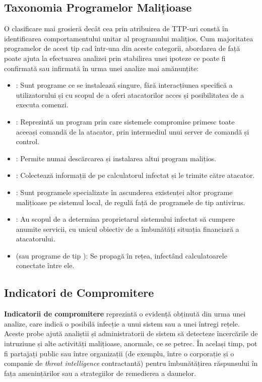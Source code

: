 \documentclass[../../main.tex]{subfiles}
\begin{document}
\subsection{Taxonomia Programelor Malițioase}

O clasificare mai grosieră decât cea prin atribuirea de TTP-uri constă în identificarea comportamentului unitar al programului malițios. Cum majoritatea programelor de acest tip cad într-una din aceste categorii, abordarea de față poate ajuta la efectuarea analizei prin stabilirea unei ipoteze ce poate fi confirmată sau infirmată în urma unei analize mai amănunțite:
\begin{itemize}
    \item {}: Sunt programe ce se instalează singure, fără interacțiunea specifică a utilizatorului și cu scopul de a oferi atacatorilor acces și posibilitatea de a executa comenzi.
    \item {}: Reprezintă un program prin care sistemele compromise primesc toate aceeași comandă de la atacator, prin intermediul unui server de comandă și control.
    \item {}: Permite numai descărcarea și instalarea altui program malițios.
    \item {}: Colectează informații de pe calculatorul infectat și le trimite către atacator.
    \item {}: Sunt programele specializate în ascunderea existenței altor programe malițioase pe sistemul local, de regulă față de programele de tip antivirus.
    \item {}: Au scopul de a determina proprietarul sistemului infectat să cumpere anumite servicii, cu unicul obiectiv de a îmbunătăți situația financiară a atacatorului.
    \item {} (sau programe de tip ): Se propagă în rețea, infectând calculatoarele conectate între ele.
\end{itemize}

\subsection{Indicatori de Compromitere}

\textbf{Indicatorii de compromitere} reprezintă o evidență obținută din urma unei analize, care indică o posibilă infecție a unui sistem sau a unei întregi rețele. Aceste probe ajută analiștii și administratorii de sistem să detecteze încercările de intruziune și alte activități malițioase, anormale, ce se petrec. În același timp, pot fi partajați public sau între organizații (de exemplu, între o corporație și o companie de \textit{threat intelligence} contractantă) pentru îmbunătățirea răspunsului în fața amenințărilor sau a strategiilor de remedierea a daunelor.
\end{document}
